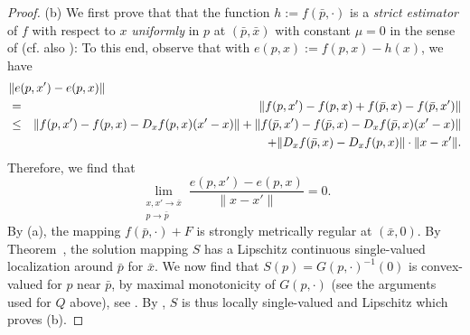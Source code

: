 \documentclass[reqno]{amsart}
\numberwithin{equation}{section}
\newcommand{\x}{\bar{x}}
\begin{document}
\begin{proof}
\noindent
(b) We first prove that  that the function $h:=f(\bar p,\cdot)$ is a {\em strict estimator} of $f$ with respect to $x$ {\em uniformly} in $p$ at $(\bar p,\bar x)$ with constant $\mu=0$ in the sense of \cite[p.~47]{DoR 14} (cf. also \cite[p.~36]{DoR 14}): To this end, observe that with $e(p,x):=f(p,x)-h(x)$, we have
\begin{eqnarray*}
\lefteqn{\|e(p,x')-e(p,x)\|}\\
& =  &  \|f(p,x')-f(p,x) + f(\bar p,x)-f(\bar p,x')\|\\  
& \leq & \|f(p,x')-f(p,x)-D_x f(p,x)(x'-x)\|+\|f(\bar p,x')-f(\bar p,x)-D_x f(\bar p,x)(x'-x)\|\\
 & & + \|D_x f(\bar p,x)-D_x f(p,x)\|\cdot\|x-x'\|.
\end{eqnarray*}
Therefore, we find that 
 \[
 \lim_{\substack{x, x' \to \x \\ p \to \bar p}} \frac{e(p,x')-e(p,x)}{\|x-x'\|}=0.
 \]
By (a), the mapping $f(\bar p,\cdot)+F$ is strongly metrically regular at $(\bar x,0)$. By Theorem~\cite[Theorem~3G.4]{DoR 14}, the solution mapping $S$ has a Lipschitz continuous single-valued localization around $\bar p$  for $\bar x$. 
We now find that $S(p)=G(p,\cdot)^{-1}(0)$ is convex-valued for $p$ near $\bar p$, by maximal monotonicity of $G(p,\cdot)$ (see the arguments used for $Q$ above), see \cite[Exercise 12.8]{RoW 98}. By , $S$ is thus locally single-valued and Lipschitz  which proves (b).


\smallskip


\end{proof}
\end{document}
